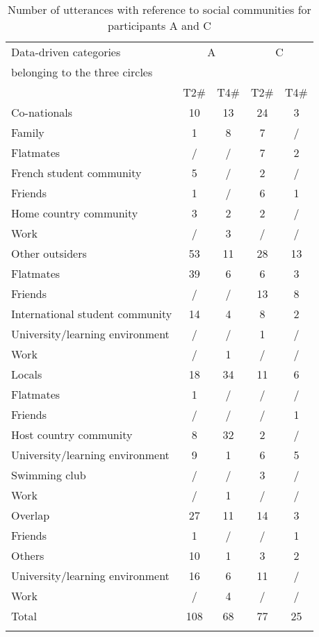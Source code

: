 \documentclass[output=paper]{langscibook}
\begin{document}
\begin{table}
\begin{tabular}{lcccc}
\lsptoprule
{Data-driven categories} & \multicolumn{2}{c}{ {A}} & \multicolumn{2}{c}{ {C}}\\
{belonging to the three circles} & \multicolumn{2}{c}{} & \multicolumn{2}{c}{}\\
\midrule
& { {T2}}{\#} & { {T4}}{\#} & { {T2}}{\#} & { {T4}}{\#}\\
\midrule
{Co-nationals} & {10} & {13} & {24} & {3}\\
Family & 1 & 8 & 7 & /\\
Flatmates & / & / & 7 & 2\\
French student community & 5 & / & 2 & /\\
Friends & 1 & / & 6 & 1\\
Home country community & 3 & 2 & 2 & /\\
Work & / & 3 & / & /\\
{Other} {outsiders} & {53} & {11} & {28} & {13}\\
Flatmates & 39 & 6 & 6 & 3\\
Friends & / & / & 13 & 8\\
International student community & 14 & 4 & 8 & 2\\
University/learning environment & / & / & 1 & /\\
Work & / & 1 & / & /\\
{Locals} & {18} & {34} & {11} & {6}\\
Flatmates & 1 & / & / & /\\
Friends & / & / & / & 1\\
Host country community & 8 & 32 & 2 & /\\
University/learning environment & 9 & 1 & 6 & 5\\
Swimming club & / & / & 3 & /\\
Work & / & 1 & / & / \\
{Overlap} & {27} & {11} & {14} & {3}\\
Friends & 1 & / & / & 1\\
Others & 10 & 1 & 3 & 2\\
University/learning environment & 16 & 6 & 11 & /\\
Work & / & 4 & / & /\\
\midrule
{Total} & {108} & {68} & {77} & {25}\\
\lspbottomrule
\end{tabular}
\caption{Number of utterances with reference to social communities for participants A and C}
\label{tab:saddour:9}
\end{table}
\end{document}

